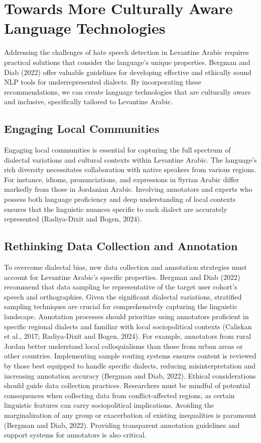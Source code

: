 \documentclass[11pt]{article}
\begin{document}
\section{Towards More Culturally Aware Language Technologies}

Addressing the challenges of hate speech detection in Levantine Arabic requires practical solutions that consider the language's unique properties. Bergman and Diab (2022) offer valuable guidelines for developing effective and ethically sound NLP tools for underrepresented dialects. By incorporating these recommendations, we can create language technologies that are culturally aware and inclusive, specifically tailored to Levantine Arabic.


\subsection{Engaging Local Communities}

Engaging local communities is essential for capturing the full spectrum of dialectal variations and cultural contexts within Levantine Arabic. The language's rich diversity necessitates collaboration with native speakers from various regions. For instance, idioms, pronunciations, and expressions in Syrian Arabic differ markedly from those in Jordanian Arabic. Involving annotators and experts who possess both language proficiency and deep understanding of local contexts ensures that the linguistic nuances specific to each dialect are accurately represented (Radiya-Dixit and Bogen, 2024).


\subsection{Rethinking Data Collection and Annotation}

To overcome dialectal bias, new data collection and annotation strategies must account for Levantine Arabic's specific properties. Bergman and Diab (2022) recommend that data sampling be representative of the target user cohort's speech and orthographies. Given the significant dialectal variations, stratified sampling techniques are crucial for comprehensively capturing the linguistic landscape. Annotation processes should prioritize using annotators proficient in specific regional dialects and familiar with local sociopolitical contexts (Caliskan et al., 2017; Radiya-Dixit and Bogen, 2024). For example, annotators from rural Jordan better understand local colloquialisms than those from urban areas or other countries. Implementing sample routing systems ensures content is reviewed by those best equipped to handle specific dialects, reducing misinterpretation and increasing annotation accuracy (Bergman and Diab, 2022). Ethical considerations should guide data collection practices. Researchers must be mindful of potential consequences when collecting data from conflict-affected regions, as certain linguistic features can carry sociopolitical implications. Avoiding the marginalization of any group or exacerbation of existing inequalities is paramount (Bergman and Diab, 2022). Providing transparent annotation guidelines and support systems for annotators is also critical.
\end{document}
